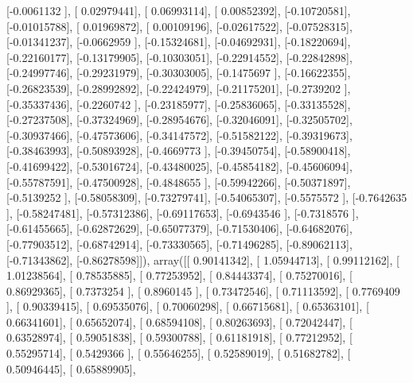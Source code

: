 \documentclass{article}
\begin{document}
       [-0.0061132 ],
       [ 0.02979441],
       [ 0.06993114],
       [ 0.00852392],
       [-0.10720581],
       [-0.01015788],
       [ 0.01969872],
       [ 0.00109196],
       [-0.02617522],
       [-0.07528315],
       [-0.01341237],
       [-0.0662959 ],
       [-0.15324681],
       [-0.04692931],
       [-0.18220694],
       [-0.22160177],
       [-0.13179905],
       [-0.10303051],
       [-0.22914552],
       [-0.22842898],
       [-0.24997746],
       [-0.29231979],
       [-0.30303005],
       [-0.1475697 ],
       [-0.16622355],
       [-0.26823539],
       [-0.28992892],
       [-0.22424979],
       [-0.21175201],
       [-0.2739202 ],
       [-0.35337436],
       [-0.2260742 ],
       [-0.23185977],
       [-0.25836065],
       [-0.33135528],
       [-0.27237508],
       [-0.37324969],
       [-0.28954676],
       [-0.32046091],
       [-0.32505702],
       [-0.30937466],
       [-0.47573606],
       [-0.34147572],
       [-0.51582122],
       [-0.39319673],
       [-0.38463993],
       [-0.50893928],
       [-0.4669773 ],
       [-0.39450754],
       [-0.58900418],
       [-0.41699422],
       [-0.53016724],
       [-0.43480025],
       [-0.45854182],
       [-0.45606094],
       [-0.55787591],
       [-0.47500928],
       [-0.4848655 ],
       [-0.59942266],
       [-0.50371897],
       [-0.5139252 ],
       [-0.58058309],
       [-0.73279741],
       [-0.54065307],
       [-0.5575572 ],
       [-0.7642635 ],
       [-0.58247481],
       [-0.57312386],
       [-0.69117653],
       [-0.6943546 ],
       [-0.7318576 ],
       [-0.61455665],
       [-0.62872629],
       [-0.65077379],
       [-0.71530406],
       [-0.64682076],
       [-0.77903512],
       [-0.68742914],
       [-0.73330565],
       [-0.71496285],
       [-0.89062113],
       [-0.71343862],
       [-0.86278598]]), array([[ 0.90141342],
       [ 1.05944713],
       [ 0.99112162],
       [ 1.01238564],
       [ 0.78535885],
       [ 0.77253952],
       [ 0.84443374],
       [ 0.75270016],
       [ 0.86929365],
       [ 0.7373254 ],
       [ 0.8960145 ],
       [ 0.73472546],
       [ 0.71113592],
       [ 0.7769409 ],
       [ 0.90339415],
       [ 0.69535076],
       [ 0.70060298],
       [ 0.66715681],
       [ 0.65363101],
       [ 0.66341601],
       [ 0.65652074],
       [ 0.68594108],
       [ 0.80263693],
       [ 0.72042447],
       [ 0.63528974],
       [ 0.59051838],
       [ 0.59300788],
       [ 0.61181918],
       [ 0.77212952],
       [ 0.55295714],
       [ 0.5429366 ],
       [ 0.55646255],
       [ 0.52589019],
       [ 0.51682782],
       [ 0.50946445],
       [ 0.65889905],
\end{document}
